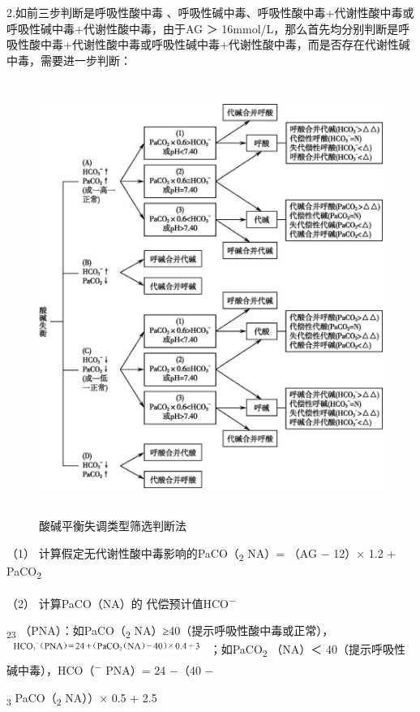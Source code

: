 2.如前三步判断是呼吸性酸中毒
、呼吸性碱中毒、呼吸性酸中毒+代谢性酸中毒或呼吸性碱中毒+代谢性酸中毒，由于AG
＞
16mmol/L，那么首先均分别判断是呼吸性酸中毒+代谢性酸中毒或呼吸性碱中毒+代谢性酸中毒，而是否存在代谢性碱中毒，需要进一步判断：

\begin{figure}[!htbp]
 \centering
 \includegraphics[width=4.97917in,height=5.57292in]{./images/Image00354.jpg}
 \captionsetup{justification=centering}
 \caption{酸碱平衡失调类型筛选判断法}
 \label{fig68-4}
  \end{figure} 

（1） 计算假定无代谢性酸中毒影响的PaCO（\textsubscript{2} NA）= （AG −
12）× 1.2 + PaCO\textsubscript{2}

（2） 计算PaCO（NA）的{} 代偿预计值HCO\textsuperscript{−}

\textsubscript{23} （PNA）：如PaCO（\textsubscript{2}
NA）≥40（提示呼吸性酸中毒或正常），\includegraphics[width=2.5625in,height=0.16667in]{./images/Image00356.jpg}
；如PaCO\textsubscript{2} （NA）＜
40（提示呼吸性碱中毒），HCO（\textsuperscript{−} PNA）= 24 −（40 −

\textsubscript{3} PaCO（\textsubscript{2} NA））× 0.5 + 2.5

